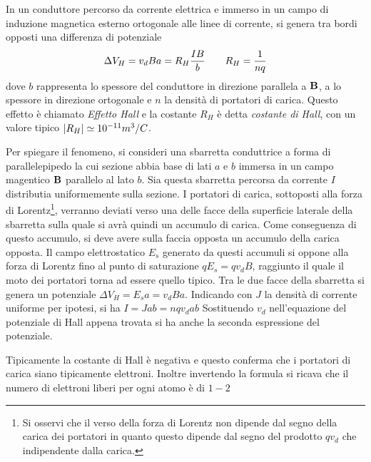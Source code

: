 In un conduttore percorso da corrente elettrica e immerso in un campo di induzione magnetica
esterno ortogonale alle linee di corrente, si genera tra bordi opposti una differenza di
potenziale
\begin{equation}
    \Delta V_H = v_d B a = R_H \frac{IB}{b} \quad\quad R_H=\frac{1}{nq}
    \label{eqn:hall}
\end{equation}
dove $b$ rappresenta lo spessore del conduttore in direzione parallela a $\vb{B}$, a lo spessore
in direzione ortogonale e $n$ la densità
di portatori di carica. Questo effetto è chiamato \textit{Effetto Hall} e la costante $R_H$ è detta
\textit{costante di Hall}, con un valore tipico $\abs{R_H}\simeq 10^{-11}m^3/C$.

Per spiegare il fenomeno, si consideri una sbarretta conduttrice a forma di parallelepipedo la cui
sezione abbia base di lati $a$ e $b$ immersa in un campo magentico $\vb{B}$ parallelo al lato $b$.
Sia questa sbarretta percorsa da corrente $I$ distributia uniformemente sulla sezione. I portatori
di carica, sottoposti alla forza di Lorentz\footnote{Si osservi che il verso della forza di Lorentz
non dipende dal segno della carica dei portatori in quanto questo dipende dal segno del prodotto $qv_d$
che indipendente dalla carica.}, verranno deviati verso una delle facce della superficie
laterale della sbarretta sulla quale si avrà quindi un accumulo di carica. Come conseguenza di questo
accumulo, si deve avere sulla faccia opposta un accumulo della carica opposta.
Il campo elettrostatico $E_s$ generato da questi accumuli si oppone alla forza di Lorentz fino al punto di
saturazione $qE_s=qv_d B$, raggiunto il quale il moto dei portatori torna ad essere quello tipico.
Tra le due facce della sbarretta si genera un potenziale $\Delta V_H=E_sa=v_dBa$.
Indicando con $J$ la densità di corrente uniforme per ipotesi, si ha $I=Jab=nqv_dab$
Sostituendo $v_d$ nell'equazione del potenziale di Hall appena trovata si ha anche la seconda
espressione del potenziale.

Tipicamente la costante di Hall è negativa e questo conferma che i portatori di carica siano tipicamente
elettroni. Inoltre invertendo la formula si ricava che il numero di elettroni liberi per ogni atomo è di
$1-2$
